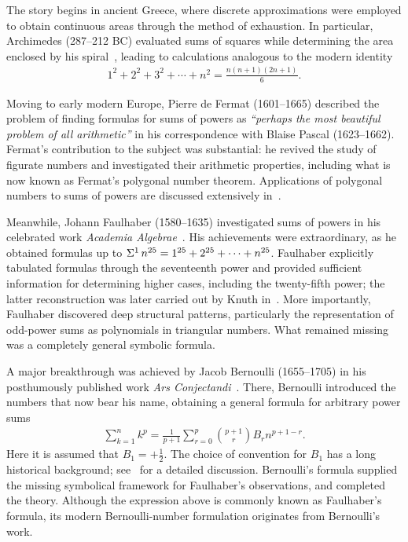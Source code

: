 The story begins in ancient Greece,
where discrete approximations were employed to obtain continuous areas through the method of exhaustion.
In particular, Archimedes (287--212 BC) evaluated sums of squares while determining
the area enclosed by his spiral~\cite{pengelley2002bridge},
leading to calculations analogous to the modern identity
\begin{align*}
  1^2 + 2^2 + 3^2 + \cdots + n^2 = \frac{n(n+1)(2n+1)}{6}.
\end{align*}

Moving to early modern Europe, Pierre de Fermat (1601--1665)
described the problem of finding formulas for sums of powers as
\textit{``perhaps the most beautiful problem of all arithmetic''}
in his correspondence with Blaise Pascal (1623--1662).
Fermat's contribution to the subject was substantial:
he revived the study of figurate numbers and investigated
their arithmetic properties,
including what is now known as Fermat's polygonal number theorem.
Applications of polygonal numbers to sums of powers
are discussed extensively in~\cite[(2020)]{Marko2020}.

Meanwhile, Johann Faulhaber (1580--1635) investigated sums of powers
in his celebrated work \textit{Academia Algebrae}~\cite[(1631)]{faulhaberacademia}.
His achievements were extraordinary,
as he obtained formulas up to
$\Sigma^{1}\,{n}^{25}=1^{25}+2^{25}+\cdots+n^{25}$.
Faulhaber explicitly tabulated formulas through the seventeenth power
and provided sufficient information for determining higher cases,
including the twenty-fifth power; the latter reconstruction was later carried out by Knuth in~\cite{knuth1993johann}.
More importantly, Faulhaber discovered deep structural patterns,
particularly the representation of odd-power sums as polynomials
in triangular numbers.
What remained missing was a completely general symbolic formula.

A major breakthrough was achieved by Jacob Bernoulli (1655--1705)
in his posthumously published work
\textit{Ars Conjectandi}~\cite[(1713)]{bernoulli1713ars}.
There, Bernoulli introduced the numbers that now bear his name,
obtaining a general formula for arbitrary power sums
\begin{align*}
  \sum_{k=1}^{n} k^p
  =
  \frac{1}{p+1}
  \sum_{r=0}^{p}
  \binom{p+1}{r}
  B_r n^{p+1-r}.
\end{align*}
Here it is assumed that $B_1=+\frac{1}{2}$.
The choice of convention for $B_1$ has a long historical background;
see~\cite{luschny2021manifesto,luschny2020introduction}
for a detailed discussion.
Bernoulli's formula supplied the missing symbolical framework
for Faulhaber's observations, and completed the theory.
Although the expression above is commonly known as Faulhaber's formula,
its modern Bernoulli-number formulation originates from Bernoulli's work.

